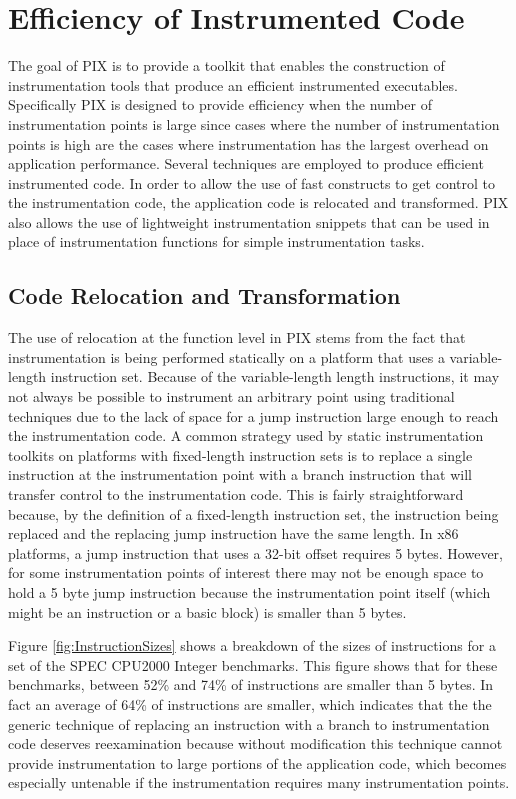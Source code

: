 \section{Efficiency of Instrumented Code}
\label{sec:Efficiency}

The goal of PIX is to provide a toolkit that enables the construction of
instrumentation tools that produce an efficient instrumented
executables. Specifically PIX is designed to provide efficiency when
the number of instrumentation points is large since cases where the number of
instrumentation points is high are the cases where instrumentation
has the largest overhead on application performance. 
Several techniques are employed to produce efficient instrumented code. In order
to allow the use of fast constructs to get control to the instrumentation code,
the application code is relocated and transformed. PIX also allows the use
of lightweight instrumentation snippets that can be used in place of
instrumentation functions for simple instrumentation tasks.

\subsection{Code Relocation and Transformation}
\label{Subsection:Relocation}
The use of relocation at the function level in PIX stems from the fact
that instrumentation is being performed statically on a platform that uses a
variable-length instruction set. Because of the variable-length length instructions, it may not always be possible to instrument
an arbitrary point using traditional techniques due to the lack of space for a jump instruction large enough to reach the instrumentation code. 
A common strategy used by static instrumentation toolkits on platforms with fixed-length instruction sets is to
replace a single instruction at the instrumentation point with a
branch instruction that will transfer control to the instrumentation code. This is fairly straightforward because, by the
definition of a fixed-length instruction set, the instruction being replaced and
the replacing jump instruction have the same length. 
In x86 platforms, a jump instruction that uses a 32-bit offset requires 5 bytes. However, for some
instrumentation points of interest there may not be enough space to hold a 5 byte
jump instruction because the instrumentation point itself (which might be an instruction or a
basic block) is smaller than 5 bytes. 

Figure \ref{fig:InstructionSizes} shows a breakdown of the sizes of
instructions for a set of the SPEC CPU2000 Integer benchmarks. This figure shows that for these benchmarks,
between 52\% and 74\% of instructions are smaller than 5 bytes. In fact an average of 64\% of instructions
are smaller, which indicates that the the generic technique of replacing 
an instruction with a branch to instrumentation code deserves reexamination because without modification
this technique cannot provide instrumentation to large portions of the application code, which becomes
especially untenable if the instrumentation requires many instrumentation points.

